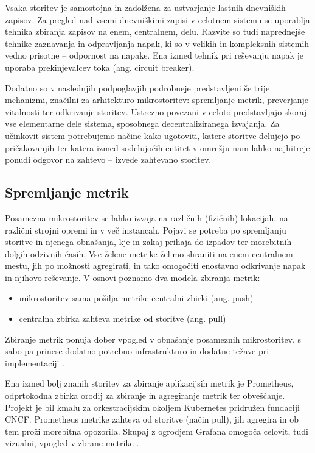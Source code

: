 \documentclass[a4paper, 12pt]{book}
\begin{document}
Vsaka storitev je samostojna in zadolžena za ustvarjanje lastnih dnevniških zapisov.
Za pregled nad vsemi dnevniškimi zapisi v celotnem sistemu se uporablja tehnika zbiranja zapisov na enem, centralnem, delu.
Razvite so tudi naprednejše tehnike zaznavanja in odpravljanja napak, ki so v velikih in kompleksnih sistemih vedno prisotne -- odpornost na napake.
Ena izmed tehnik pri reševanju napak je uporaba prekinjevalcev toka (ang. circuit breaker)\cite{sarcMag}.

Dodatno so v naslednjih podpoglavjih podrobneje predstavljeni še trije mehanizmi, značilni za arhitekturo mikrostoritev: spremljanje metrik, preverjanje vitalnosti ter odkrivanje storitev.
Ustrezno povezani v celoto predstavljajo skoraj vse elementarne dele sistema, sposobnega decentraliziranega izvajanja.
Za učinkovit sistem potrebujemo načine kako ugotoviti, katere storitve delujejo po pri\-ča\-ko\-va\-njih ter katera izmed sodelujočih entitet v omrežju nam lahko najhitreje ponudi odgovor na zahtevo -- izvede zahtevano storitev.

\subsection{Spremljanje metrik}

Posamezna mikrostoritev se lahko izvaja na različnih (fizičnih) lokacijah, na različni strojni opremi in v več instancah.
Pojavi se potreba po spremljanju storitve in njenega obnašanja, kje in zakaj prihaja do izpadov ter morebitnih dolgih odzivnih časih.
Vse želene metrike želimo shraniti na enem centralnem mestu, jih po možnosti agregirati, in tako omogočiti enostavno odkrivanje napak in njihovo reševanje.
V osnovi poznamo dva modela zbiranja metrik: 
\begin{itemize}
	\item mikrostoritev sama pošilja metrike centralni zbirki (ang. push)
	\item centralna zbirka zahteva metrike od storitve (ang. pull)
\end{itemize}

Zbiranje metrik ponuja dober vpogled v obnašanje posameznih mikrostoritev, s sabo pa prinese dodatno potrebno infrastrukturo in dodatne težave pri implementaciji \cite{ApplicationMetrics}.


Ena izmed bolj znanih storitev za zbiranje aplikacijsih metrik je Prometheus, odprtokodna zbirka orodij za zbiranje in agregiranje metrik ter obveščanje.
Projekt je bil kmalu za orkestracijskim okoljem Kubernetes pridružen fundaciji CNCF.
Prometheus metrike zahteva od storitve (način pull), jih agregira in ob tem proži morebitna opozorila.
Skupaj z ogrodjem Grafana omogoča celovit, tudi vizualni, vpogled v zbrane metrike \cite{Prometheus}.
\end{document}
